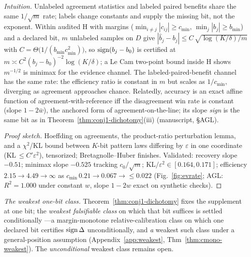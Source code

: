 \begin{theorem}\label{thm:ev-rate}\label{thm:agl}
\emph{Intuition.} Unlabeled agreement statistics and labeled paired benefits share the same
$1/\sqrt{m}$ rate; labels change constants and supply the missing bit, not the exponent.
Within audited H with margins ($\min_{i\ne j}|c_{ij}|\ge c_{\min}$,
$\min_j|b_j|\ge b_{\min}$) and a declared bit, $m$ unlabeled samples on $D$ give
$|\hat b_j-b_j|\le C\,\sqrt{\log(K/\delta)/m}$ with
$C=\Theta\big(1/(b_{\min}c_{\min}^2)\big)$, so $\operatorname{sign}(b_j-b_0)$ is certified at
$m\asymp C^2(b_j-b_0)^{-2}\log(K/\delta)$; a Le Cam two-point bound inside H shows
$m^{-1/2}$ is minimax for the evidence channel. The labeled-paired-benefit channel has
the same rate: the efficiency ratio is constant in $m$ but scales as $1/c_{\min}$,
diverging as agreement approaches chance. Relatedly, accuracy is an exact affine
function of agreement-with-reference iff the disagreement win rate is constant (slope
$1-2\bar w$), the anchored form of agreement-on-the-line; its slope \emph{sign} is the
same bit as in Theorem~\ref{thm:conj1-dichotomy}(iii) (manuscript, \S AGL).
\end{theorem}
\begin{proof}[Proof sketch]
Hoeffding on agreements, the product-ratio perturbation lemma, and a $\chi^2$/KL bound
between $K$-bit pattern laws differing by $\varepsilon$ in one coordinate
(KL$\,\le C'\varepsilon^2$), tensorized; Bretagnolle--Huber finishes. Validated:
recovery slope $-0.51$; minimax slope $-0.525$ tracking $c_0/\sqrt m$;
KL$/\varepsilon^2\in[0.164,0.171]$; efficiency $2.15\to4.49\to\infty$ as
$c_{\min}\,0.21\to0.067\to{\le}0.022$ (Fig.~\ref{fig:evrate};
AGL: $R^2=1.000$ under constant $w$, slope $1-2w$ exact on synthetic checks).
\end{proof}

\smallskip
\noindent\emph{The weakest one-bit class.} Theorem~\ref{thm:conj1-dichotomy} fixes the supplement at one bit; the \emph{weakest falsifiable class} on which that bit suffices is settled conditionally ---a margin-monotone relative-calibration class on which one declared bit certifies $\operatorname{sign}\Delta$ unconditionally, and \emph{a} weakest such class under a general-position assumption (Appendix~\ref{app:weakest}, Thm~\ref{thm:cmono-weakest}). The \emph{unconditional} weakest class remains open.

